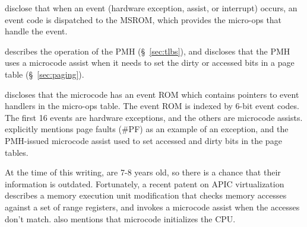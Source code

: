 









\cite{intel1997events, intel1999exceptions} disclose that when an event
(hardware exception, assist, or interrupt) occurs, an event code is dispatched
to the MSROM, which provides the micro-ops that handle the event.

\cite{intel1997pmh} describes the operation of the PMH (\S~\ref{sec:tlbs}), and
discloses that the PMH uses a microcode assist when it needs to set the dirty
or accessed bits in a page table (\S~\ref{sec:paging}).

\cite{intel1999events} discloses that the microcode has an event ROM which
contains pointers to event handlers in the micro-ops table. The event ROM is
indexed by 6-bit event codes. The first 16 events are hardware exceptions, and
the others are microcode assists. \cite{intel1999events} explicitly mentions
page faults (\#PF) as an example of an exception, and the PMH-issued microcode
assist used to set accessed and dirty bits in the page tables.

At the time of this writing, \cite{intel1997events, intel1999exceptions,
intel1997pmh, intel1999events} are 7-8 years old, so there is a chance that
their information is outdated. Fortunately, a recent patent on APIC
virtualization \cite{intel2014vapic} describes a memory execution unit
modification that checks memory accesses against a set of range registers, and
invokes a microcode assist when the accesses don't match.
\cite{intel2014vapic} also mentions that microcode initializes the CPU.


